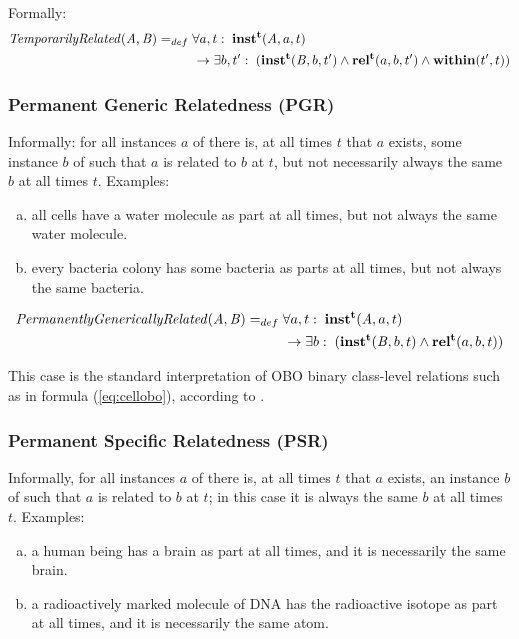 Formally:
\begin{equation}
\begin{split}
\mathit{TemporarilyRelated}(\mathit{A},\mathit{B}) =_{def}&\;
\forall a, t:\; \mathrm{\mathbf{inst^t}}(\mathit{A}, a, t) \\
&\ \rightarrow
\exists b, t^\prime:\;(\mathrm{\mathbf{inst^t}}(\mathit{B},b,t^\prime) \wedge
\mathrm{\mathbf{rel^t}}(a,b,t^\prime) \wedge \mathrm{\mathbf{within}}(t^\prime,t))
\end{split}
\label{eq:temporarily:cls}
\end{equation}

\subsubsection*{Permanent Generic Relatedness (PGR)}

Informally: for all instances $a$ of  there is, at all times $t$ that
$a$ exists,
some instance $b$ of  such that $a$ is related to $b$ at $t$, but not necessarily
always the same $b$ at all times $t$. Examples:
\begin{enumerate}[(a)]
\item all cells have a water molecule as
part at all times, but not always the same water molecule.
\item every bacteria colony has some bacteria as parts at all times, but not
always the same bacteria.
\end{enumerate}

\begin{equation}
\begin{split}
\mathit{PermanentlyGenericallyRelated}(\mathit{A},\mathit{B}) =_{def}&\;
\forall a, t:\; \mathrm{\mathbf{inst^t}}(\mathit{A}, a, t) \\
&\ \rightarrow
\exists b:\;(\mathrm{\mathbf{inst^t}}(\mathit{B},b,t) \wedge
\mathrm{\mathbf{rel^t}}(a,b,t))
\end{split}
\label{eq:generically:cls}
\end{equation}

This case is the standard interpretation of OBO binary class-level relations such as in formula (\ref{eq:cellobo}), according to \cite{OBO:RO}.

\subsubsection*{Permanent Specific Relatedness (PSR)}

Informally, for all instances $a$ of  there is, at all times $t$ that $a$ exists, an
instance $b$ of  such that $a$ is related to $b$ at $t$; in this case it is always the
same $b$ at all times $t$. Examples:
\begin{enumerate}[(a)]
\item a human being has a brain as part at all times, and it is necessarily the same brain.
\item a radioactively marked molecule of DNA has the radioactive isotope as part
at all times, and it is necessarily the same atom.
\end{enumerate}

